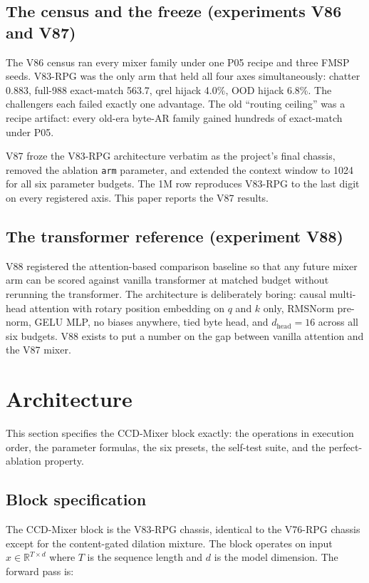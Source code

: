 \documentclass[11pt]{article}
\begin{document}
\subsection{The census and the freeze (experiments V86 and V87)}

The V86 census ran every mixer family under one P05 recipe and three FMSP seeds. V83-RPG was the only arm that held all four axes simultaneously: chatter 0.883, full-988 exact-match 563.7, qrel hijack 4.0\%, OOD hijack 6.8\%. The challengers each failed exactly one advantage. The old ``routing ceiling'' was a recipe artifact: every old-era byte-AR family gained hundreds of exact-match under P05.

V87 froze the V83-RPG architecture verbatim as the project's final chassis, removed the ablation \texttt{arm} parameter, and extended the context window to 1024 for all six parameter budgets. The 1M row reproduces V83-RPG to the last digit on every registered axis. This paper reports the V87 results.

\subsection{The transformer reference (experiment V88)}

V88 registered the attention-based comparison baseline so that any future mixer arm can be scored against vanilla transformer at matched budget without rerunning the transformer. The architecture is deliberately boring: causal multi-head attention with rotary position embedding on $q$ and $k$ only, RMSNorm pre-norm, GELU MLP, no biases anywhere, tied byte head, and $d_{\text{head}} = 16$ across all six budgets. V88 exists to put a number on the gap between vanilla attention and the V87 mixer.

\section{Architecture}

This section specifies the CCD-Mixer block exactly: the operations in execution order, the parameter formulas, the six presets, the self-test suite, and the perfect-ablation property.

\subsection{Block specification}

The CCD-Mixer block is the V83-RPG chassis, identical to the V76-RPG chassis except for the content-gated dilation mixture. The block operates on input $x \in \mathbb{R}^{T \times d}$ where $T$ is the sequence length and $d$ is the model dimension. The forward pass is:
\end{document}
